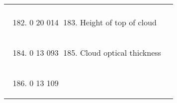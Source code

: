\begin{longtable}[]{@{}llll@{}}
\begin{minipage}[t]{0.22\columnwidth}
\strut
\end{minipage}\tabularnewline
\begin{minipage}[t]{0.22\columnwidth}\raggedright
\strut
\end{minipage} & \begin{minipage}[t]{0.22\columnwidth}\raggedright
\begin{enumerate}
\setcounter{enumi}{181}
\item
  0 20 014
\end{enumerate}\strut
\end{minipage} & \begin{minipage}[t]{0.22\columnwidth}\raggedright
\begin{enumerate}
\setcounter{enumi}{182}
\item
  Height of top of cloud
\end{enumerate}\strut
\end{minipage} & \begin{minipage}[t]{0.22\columnwidth}\raggedright
\strut
\end{minipage}\tabularnewline
\begin{minipage}[t]{0.22\columnwidth}\raggedright
\strut
\end{minipage} & \begin{minipage}[t]{0.22\columnwidth}\raggedright
\begin{enumerate}
\setcounter{enumi}{183}
\item
  0 13 093
\end{enumerate}\strut
\end{minipage} & \begin{minipage}[t]{0.22\columnwidth}\raggedright
\begin{enumerate}
\setcounter{enumi}{184}
\item
  Cloud optical thickness
\end{enumerate}\strut
\end{minipage} & \begin{minipage}[t]{0.22\columnwidth}\raggedright
\strut
\end{minipage}\tabularnewline
\begin{minipage}[t]{0.22\columnwidth}\raggedright
\strut
\end{minipage} & \begin{minipage}[t]{0.22\columnwidth}\raggedright
\begin{enumerate}
\setcounter{enumi}{185}
\item
  0 13 109
\end{enumerate}\strut
\end{minipage} & \begin{minipage}[t]{0.22\columnwidth}\raggedright

\end{minipage}
\end{longtable}
